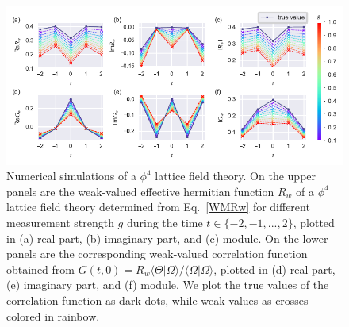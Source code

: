 \documentclass[twocolumn,pra,aps,superscriptaddress]{revtex4-2}
\begin{document}
 \begin{figure}
\includegraphics[width=17.2cm]{Fig4}
\caption{\label{fig:qft}  Numerical simulations of a $\phi^4$ lattice field theory. On the upper panels are the weak-valued effective hermitian function $R_w$ of a $\phi^4$ lattice field theory determined from Eq.~\eqref{WMRw} for different measurement strength $g$ during the time  $t\in\{-2,-1,...,2\}$, plotted in (a) real part, (b) imaginary part, and (c) module. On the lower panels are the corresponding weak-valued correlation function obtained from $G(t,0)=R_w\langle\Theta|\Omega\rangle / \langle\Omega|\Omega\rangle$, plotted in (d) real part, (e) imaginary part, and (f) module. We plot the true values of the correlation function as dark dots, while weak values as crosses colored in rainbow. }
\end{figure}
\end{document}
